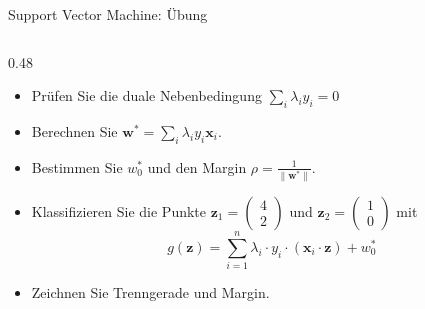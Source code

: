 {\begin{frame}{Support Vector Machine: Übung}
{\begin{columns}[T,onlytextwidth]
\begin{column}{0.48\textwidth}
\begin{itemize}
\item[a)] Prüfen Sie die duale Nebenbedingung $\sum_i \lambda_i y_i = 0$ 
\item[b)] Berechnen Sie           $\mathbf{w}^{*} = \sum_i \lambda_i y_i \mathbf{x}_i$.
\item[c)] Bestimmen Sie $w_0^{*}$ und den Margin
          $\rho = \frac{1}{\lVert\mathbf{w}^{*}\rVert}$.
\item[d)] Klassifizieren Sie die Punkte
          $\mathbf{z}_1 = \begin{pmatrix} 4 \\ 2 \end{pmatrix}$ und
          $\mathbf{z}_2 = \begin{pmatrix} 1 \\ 0 \end{pmatrix}$ mit
          \[
            \boxed{
            g(\mathbf{z}) = \sum_{i=1}^{n}\lambda_i \cdot y_i\cdot
            (\mathbf{x}_i\!\cdot\mathbf{z}) + w_0^{*}}
          \]
\item[e)] Zeichnen Sie Trenngerade und Margin.
\end{itemize}
\end{column}

\end{columns}
}



\end{frame}}
